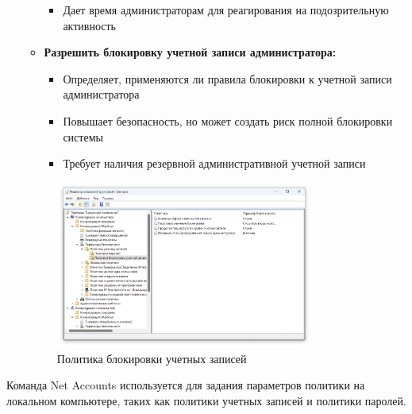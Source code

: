 \documentclass[a4paper, 14pt]{report}
\begin{document}
\begin{enumerate}
\begin{itemize}
\begin{itemize}
                        \item Дает время администраторам для реагирования на подозрительную активность
                    \end{itemize}
              \item \textbf{Разрешить блокировку учетной записи администратора:}
                    \begin{itemize}
                        \item Определяет, применяются ли правила блокировки к учетной записи администратора
                        \item Повышает безопасность, но может создать риск полной блокировки системы
                        \item Требует наличия резервной административной учетной записи
                    \end{itemize}
          \end{itemize}
          \begin{figure}[H]
              \centering
              \includegraphics[width=0.8\textwidth]{../images/account_lockout_policy.png}
              \caption{Политика блокировки учетных записей}
          \end{figure}
\end{enumerate}
Команда Net Accounts используется для задания параметров политики на локальном компьютере, таких как политики учетных записей и политики паролей.
\end{document}
